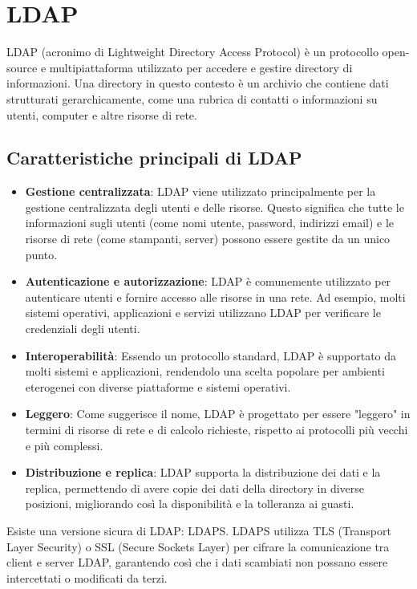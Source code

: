 \documentclass[12pt,a4paper]{report}
\begin{document}
\section{LDAP}
LDAP (acronimo di Lightweight Directory Access Protocol) è un protocollo open-source e multipiattaforma utilizzato per accedere e gestire directory di informazioni. Una directory in questo contesto è un archivio che contiene dati strutturati gerarchicamente, come una rubrica di contatti o informazioni su utenti, computer e altre risorse di rete.
\subsection{Caratteristiche principali di LDAP}
\begin{itemize}
    \item \textbf{Gestione centralizzata}: LDAP viene utilizzato principalmente per la gestione centralizzata degli utenti e delle risorse. Questo significa che tutte le informazioni sugli utenti (come nomi utente, password, indirizzi email) e le risorse di rete (come stampanti, server) possono essere gestite da un unico punto.
    \item \textbf{Autenticazione e autorizzazione}: LDAP è comunemente utilizzato per autenticare utenti e fornire accesso alle risorse in una rete. Ad esempio, molti sistemi operativi, applicazioni e servizi utilizzano LDAP per verificare le credenziali degli utenti.
    \item \textbf{Interoperabilità}: Essendo un protocollo standard, LDAP è supportato da molti sistemi e applicazioni, rendendolo una scelta popolare per ambienti eterogenei con diverse piattaforme e sistemi operativi.
    \item \textbf{Leggero}: Come suggerisce il nome, LDAP è progettato per essere "leggero" in termini di risorse di rete e di calcolo richieste, rispetto ai protocolli più vecchi e più complessi.
    \item \textbf{Distribuzione e replica}: LDAP supporta la distribuzione dei dati e la replica, permettendo di avere copie dei dati della directory in diverse posizioni, migliorando così la disponibilità e la tolleranza ai guasti.
\end{itemize}
Esiste una versione sicura di LDAP: LDAPS. LDAPS utilizza TLS (Transport Layer Security) o SSL (Secure Sockets Layer) per cifrare la comunicazione tra client e server LDAP, garantendo così che i dati scambiati non possano essere intercettati o modificati da terzi.
\end{document}
